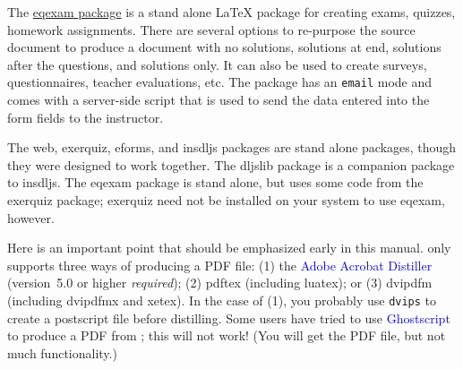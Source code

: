 \documentclass{article}
\def\bUrl{http://www.math.uakron.edu/~dpstory}
\let\pkg\textsf
\begin{document}
\begin{questions}
\item The \href{\bUrl/eqexam.html}{\pkg{eqexam} package} is a stand
    alone {\LaTeX} package for creating exams, quizzes, homework
    assignments. There are several options to re-purpose the source
    document to produce a document with no solutions, solutions at end,
    solutions after the questions, and solutions only. It can also be used
    to create surveys, questionnaires, teacher evaluations, etc. The
    package has an \texttt{email} mode and comes with a server-side script
    that is used to send the data entered into the form fields to the
    instructor.

\end{questions}
\handpoint The \pkg{web}, \textsf{exerquiz}, \textsf{eforms}, and \textsf{insdljs}
packages are stand alone packages, though they were designed to work
together. The \textsf{dljslib} package is a companion package to
\textsf{insdljs}. The \textsf{eqexam} package is stand alone, but uses
some code from the \textsf{exerquiz} package; \textsf{exerquiz} need not
be installed on your system to use \textsf{eqexam}, however.

\begin{comment}
To play it safe, you should use the most recent version of
\pkg{hyperref} by Sebastian Rahtz and Heiko Oberdiek. The
\textsf{exerquiz} package makes extensive use of forms; Adobe
Reader 3.0 with Forms 3.5 at least is needed, Adobe Reader 4.0 or
above is preferred.
\end{comment}

\handpoint Here is an important point that should be emphasized early in this
manual. \cAcroT{} only supports three ways of producing a
\textsf{PDF} file: (1) the \textcolor{blue}{Adobe Acrobat
Distiller} (version~5.0 or higher \emph{required}); (2)
\textsf{pdftex} (including \textsf{luatex}); or (3) \textsf{dvipdfm}
(including \textsf{dvipdfmx} and \textsf{xetex}). In the case of (1), you
probably use \texttt{dvips} to create a postscript file before
distilling. Some users have tried to use
\textcolor{blue}{Ghostscript} to produce a \textsf{PDF}
from \cAcroT; this will not work! (You will get the \textsf{PDF}
file, but not much functionality.)
\end{document}
